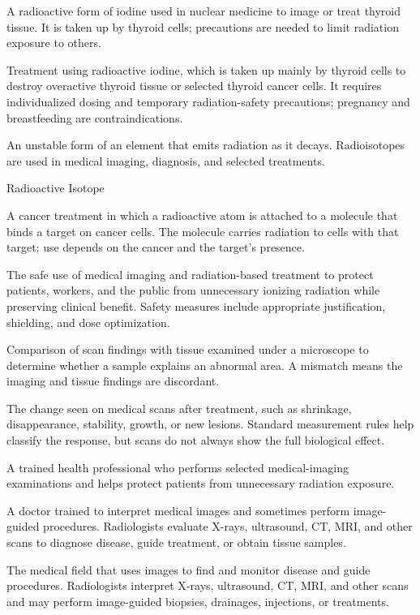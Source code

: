  A radioactive form of iodine used in nuclear medicine to image or treat thyroid tissue. It is taken up by thyroid cells; precautions are needed to limit radiation exposure to others.

 Treatment using radioactive iodine, which is taken up mainly by thyroid cells to destroy overactive thyroid tissue or selected thyroid cancer cells. It requires individualized dosing and temporary radiation-safety precautions; pregnancy and breastfeeding are contraindications.

 An unstable form of an element that emits radiation as it decays. Radioisotopes are used in medical imaging, diagnosis, and selected treatments.

\synonyms
Radioactive Isotope

 A cancer treatment in which a radioactive atom is attached to a molecule that binds a target on cancer cells. The molecule carries radiation to cells with that target; use depends on the cancer and the target's presence.

 The safe use of medical imaging and radiation-based treatment to protect patients, workers, and the public from unnecessary ionizing radiation while preserving clinical benefit. Safety measures include appropriate justification, shielding, and dose optimization.

 Comparison of scan findings with tissue examined under a microscope to determine whether a sample explains an abnormal area. A mismatch means the imaging and tissue findings are discordant.

 The change seen on medical scans after treatment, such as shrinkage, disappearance, stability, growth, or new lesions. Standard measurement rules help classify the response, but scans do not always show the full biological effect.

 A trained health professional who performs selected medical-imaging examinations and helps protect patients from unnecessary radiation exposure.

 A doctor trained to interpret medical images and sometimes perform image-guided procedures. Radiologists evaluate X-rays, ultrasound, CT, MRI, and other scans to diagnose disease, guide treatment, or obtain tissue samples.

 The medical field that uses images to find and monitor disease and guide procedures. Radiologists interpret X-rays, ultrasound, CT, MRI, and other scans and may perform image-guided biopsies, drainages, injections, or treatments.

